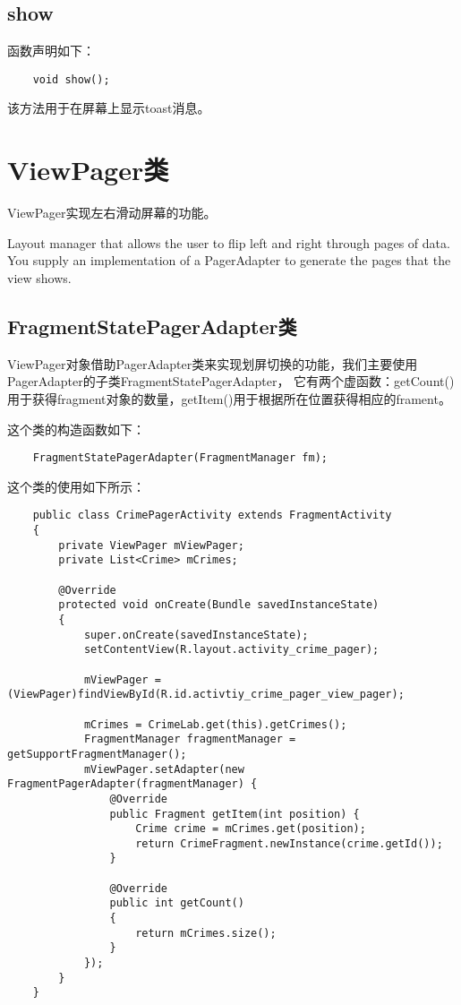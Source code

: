 \documentclass[a4paper,left=2.5cm,right=2.5cm,11pt]{article}
\begin{document}
\subsection{show}
	函数声明如下：
	\begin{lstlisting}
	void show();
	\end{lstlisting}

	该方法用于在屏幕上显示toast消息。

\section{ViewPager类}
	ViewPager实现左右滑动屏幕的功能。\par

	Layout manager that allows the user to flip left and right through pages of data. You supply an implementation of a PagerAdapter to generate the pages that the view shows.

\subsection{FragmentStatePagerAdapter类}
	ViewPager对象借助PagerAdapter类来实现划屏切换的功能，我们主要使用PagerAdapter的子类FragmentStatePagerAdapter，
	它有两个虚函数：getCount()用于获得fragment对象的数量，getItem()用于根据所在位置获得相应的frament。\par

	这个类的构造函数如下：
	\begin{lstlisting}
	FragmentStatePagerAdapter(FragmentManager fm);
	\end{lstlisting}

	这个类的使用如下所示：
	\begin{lstlisting}
	public class CrimePagerActivity extends FragmentActivity
	{
		private ViewPager mViewPager;
		private List<Crime> mCrimes;

		@Override
		protected void onCreate(Bundle savedInstanceState)
		{
			super.onCreate(savedInstanceState);
			setContentView(R.layout.activity_crime_pager);

			mViewPager = (ViewPager)findViewById(R.id.activtiy_crime_pager_view_pager);

			mCrimes = CrimeLab.get(this).getCrimes();
			FragmentManager fragmentManager = getSupportFragmentManager();
			mViewPager.setAdapter(new FragmentPagerAdapter(fragmentManager) {
				@Override
				public Fragment getItem(int position) {
					Crime crime = mCrimes.get(position);
					return CrimeFragment.newInstance(crime.getId());
				}

				@Override
				public int getCount()
				{
					return mCrimes.size();
				}
			});
		}
	}
	\end{lstlisting}
\end{document}
